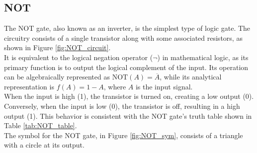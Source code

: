 \subsection{NOT}
    The NOT gate, also known as an inverter, is the simplest type of logic gate. 
    The circuitry consists of a single transistor along with some associated resistors, as shown in Figure \ref{fig:NOT_circuit}. \\
    It is equivalent to the logical negation operator ($\neg$) in mathematical logic, as its primary function is to output the logical complement of the input.
    Its operation can be algebraically represented as $\text{NOT}(A) = \overline{A}$, while its analytical representation is $f(A)=1-A$, where $A$ is the input signal. \\
    When the input is high (1), the transistor is turned on, creating a low output (0). 
    Conversely, when the input is low (0), the transistor is off, resulting in a high output (1).
    This behavior is consistent with the NOT gate's truth table shown in Table \ref{tab:NOT_table}. \\
    The symbol for the NOT gate, in Figure \ref{fig:NOT_sym}, consists of a triangle with a circle at its output.


